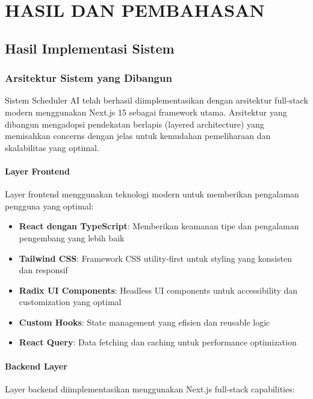 \chapter{HASIL DAN PEMBAHASAN}
\thispagestyle{plain}

\section{Hasil Implementasi Sistem}

\subsection{Arsitektur Sistem yang Dibangun}

Sistem Scheduler AI telah berhasil diimplementasikan dengan arsitektur full-stack modern menggunakan Next.js 15 sebagai framework utama. Arsitektur yang dibangun mengadopsi pendekatan berlapis (layered architecture) yang memisahkan concerns dengan jelas untuk kemudahan pemeliharaan dan skalabilitas yang optimal.

\subsubsection{Layer Frontend}

Layer frontend menggunakan teknologi modern untuk memberikan pengalaman pengguna yang optimal:

\begin{itemize}
\item \textbf{React dengan TypeScript}: Memberikan keamanan tipe dan pengalaman pengembang yang lebih baik
\item \textbf{Tailwind CSS}: Framework CSS utility-first untuk styling yang konsisten dan responsif
\item \textbf{Radix UI Components}: Headless UI components untuk accessibility dan customization yang optimal
\item \textbf{Custom Hooks}: State management yang efisien dan reusable logic
\item \textbf{React Query}: Data fetching dan caching untuk performance optimization
\end{itemize}

\subsubsection{Backend Layer}

Layer backend diimplementasikan menggunakan Next.js full-stack capabilities:

